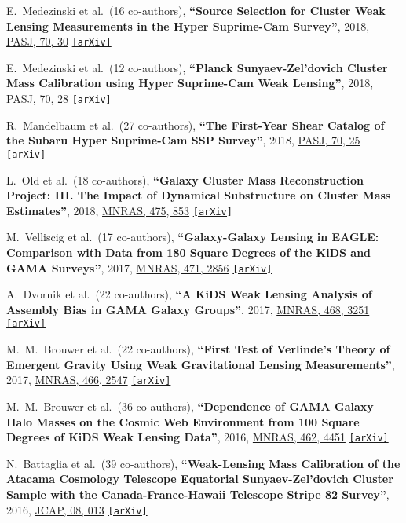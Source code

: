 \documentclass{article}
\def\jcap{JCAP}
\def\mnras{MNRAS}
\def\pasj{PASJ}
\newcommand{\etal}[1]{et al.\ (#1 co-authors),}
\newcommand{\paper}[1]{\textbf{``#1''}}
\newcommand{\arxiv}[1]
    {\href{https://arxiv.org/abs/#1}{\texttt{\color{magenta}[arXiv]}}}
\begin{document}
\begin{etaremune}
\item
E.~Medezinski \etal{16}
\paper{Source Selection for Cluster Weak Lensing Measurements in the Hyper Suprime-Cam Survey},
2018, \href{http://adsabs.harvard.edu/abs/2018PASJ...70...30M}{\pasj, 70, 30}
\arxiv{1706.00427}

\item
E.~Medezinski \etal{12}
\paper{Planck Sunyaev-Zel'dovich Cluster Mass Calibration using Hyper Suprime-Cam Weak Lensing},
2018, \href{http://adsabs.harvard.edu/abs/2018PASJ...70S..28M}{\pasj, 70, 28}
\arxiv{1706.00434}

\item
R.~Mandelbaum \etal{27}
\paper{The First-Year Shear Catalog of the Subaru Hyper Suprime-Cam SSP Survey},
2018, \href{http://adsabs.harvard.edu/abs/2018PASJ...70S..25M}{\pasj, 70, 25}
\arxiv{1705.06745}

\item
L.~Old \etal{18}
\paper{Galaxy Cluster Mass Reconstruction Project: III. The Impact of Dynamical Substructure on Cluster Mass Estimates},
2018, \href{http://adsabs.harvard.edu/abs/2018MNRAS.475..853O}{\mnras, 475, 853}
\arxiv{1709.10108}

\item
M.~Velliscig \etal{17}
\paper{Galaxy-Galaxy Lensing in EAGLE: Comparison with Data from 180 Square Degrees of the KiDS and GAMA Surveys},
2017, \href{http://adsabs.harvard.edu/abs/2017MNRAS.471.2856V}{\mnras, 471, 2856}
\arxiv{1612.04825}

\item
A.~Dvornik \etal{22}
\paper{A KiDS Weak Lensing Analysis of Assembly Bias in GAMA Galaxy Groups},
2017, \href{http://adsabs.harvard.edu/abs/2017MNRAS.468.3251D}{\mnras, 468, 3251}
\arxiv{1703.06657}

\item
M.~M.~Brouwer \etal{22}
\paper{First Test of Verlinde's Theory of Emergent Gravity Using Weak Gravitational Lensing Measurements},
2017, \href{http://adsabs.harvard.edu/abs/2017MNRAS.466.2547B}{\mnras, 466, 2547}
\arxiv{1612.03034}

\item
M.~M.~Brouwer \etal{36}
\paper{Dependence of GAMA Galaxy Halo Masses on the Cosmic Web Environment from 100 Square Degrees of KiDS Weak Lensing Data},
2016, \href{http://adsabs.harvard.edu/abs/2016MNRAS.462.4451B}{\mnras, 462, 4451}
\arxiv{1604.07233}

\item
N.~Battaglia \etal{39}
\paper{Weak-Lensing Mass Calibration of the Atacama Cosmology Telescope Equatorial Sunyaev-Zel'dovich Cluster Sample with the Canada-France-Hawaii Telescope Stripe 82 Survey},
2016, \href{http://adsabs.harvard.edu/abs/2016JCAP...08..013B}{\jcap, 08, 013}
\arxiv{1509.08930}


\end{etaremune}
\end{document}
